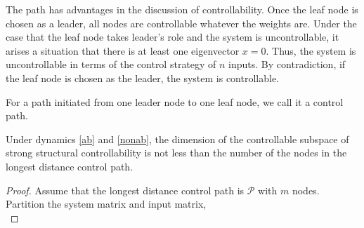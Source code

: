 \documentclass[a4paper,11pt]{article}
\begin{document}
{The path has advantages in the discussion of controllability. Once the leaf node is chosen as a leader, all nodes  are controllable whatever the weights are. Under the case that the leaf node takes leader's role and the system is uncontrollable, it arises a situation that there is at least one eigenvector $x=0$. %
Thus, the system is uncontrollable in terms of the control strategy of $n$ inputs.
By contradiction, if the leaf node is chosen as the leader, the system is controllable.
\begin{definition}
 For a path initiated from one leader node to one leaf node, we call it a control path.
\end{definition}
\begin{theorem}\label{pathcontrollable}
Under dynamics \eqref{ab} and \eqref{nonab}, the dimension of the controllable subspace of strong structural controllability is not less than the number of the nodes in the longest distance control path.
\end{theorem}
\begin{proof}
Assume that the longest distance control path is $\mathcal{P}$ with $m$ nodes. Partition the system matrix and input matrix,
\begin{equation*}

\end{equation*}
\end{proof}}
\end{document}
